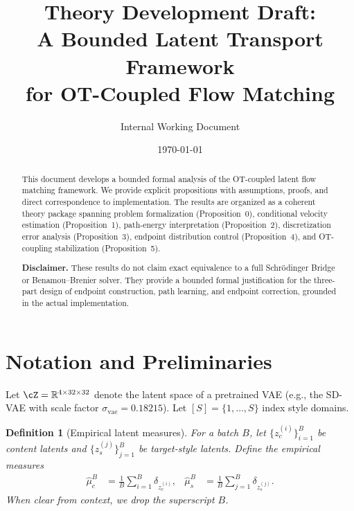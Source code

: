 \documentclass[letterpaper]{article}
\title{Theory Development Draft:\\A Bounded Latent Transport Framework\\for OT-Coupled Flow Matching}
\author{Internal Working Document}
\date{\today}
\newtheorem{definition}[proposition]{Definition}
\newcommand{\R}{\mathbb{R}}
\begin{document}
\maketitle

\begin{abstract}
This document develops a bounded formal analysis of the OT-coupled latent flow matching framework.
We provide explicit propositions with assumptions, proofs, and direct correspondence to implementation.
The results are organized as a coherent theory package spanning problem formalization (Proposition~0),
conditional velocity estimation (Proposition~1), path-energy interpretation (Proposition~2),
discretization error analysis (Proposition~3), endpoint distribution control (Proposition~4),
and OT-coupling stabilization (Proposition~5).

\textbf{Disclaimer.}
These results do not claim exact equivalence to a full Schr\"odinger Bridge or Benamou--Brenier solver.
They provide a bounded formal justification for the three-part design of endpoint construction,
path learning, and endpoint correction, grounded in the actual implementation.
\end{abstract}

\tableofcontents

\newpage

\section{Notation and Preliminaries}

Let $\cZ = \R^{4 \times 32 \times 32}$ denote the latent space of a pretrained VAE
(e.g., the SD-VAE with scale factor $\sigma_{\text{vae}} = 0.18215$).
Let $[S] = \{1,\dots,S\}$ index style domains.

\begin{definition}[Empirical latent measures]
For a batch $B$, let $\{z_c^{(i)}\}_{i=1}^B$ be content latents and
$\{z_s^{(j)}\}_{j=1}^B$ be target-style latents.
Define the empirical measures
\begin{align}
    \hat\mu_c^B &= \frac{1}{B}\sum_{i=1}^B \delta_{z_c^{(i)}},
    &
    \hat\mu_s^B &= \frac{1}{B}\sum_{j=1}^B \delta_{z_s^{(j)}}.
\end{align}
When clear from context, we drop the superscript $B$.
\end{definition}
\end{document}
